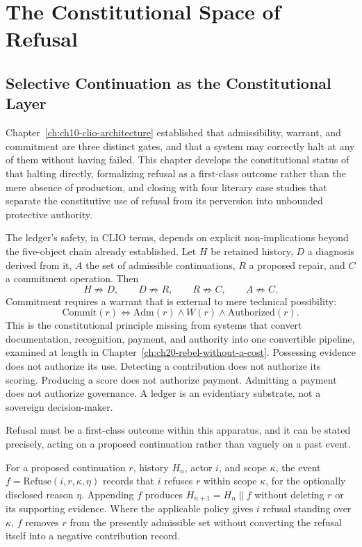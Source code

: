 
\chapter{The Constitutional Space of Refusal}
\label{ch:ch11-constitutional-space-of-refusal}
\section{Selective Continuation as the Constitutional Layer}

Chapter~\ref{ch:ch10-clio-architecture} established that admissibility, warrant, and commitment are three distinct gates, and that a system may correctly halt at any of them without having failed. This chapter develops the constitutional status of that halting directly, formalizing refusal as a first-class outcome rather than the mere absence of production, and closing with four literary case studies that separate the constitutive use of refusal from its perversion into unbounded protective authority.

The ledger's safety, in CLIO terms, depends on explicit non-implications beyond the five-object chain already established. Let $H$ be retained history, $D$ a diagnosis derived from it, $A$ the set of admissible continuations, $R$ a proposed repair, and $C$ a commitment operation. Then
\[
H \not\Rightarrow D, \qquad D \not\Rightarrow R, \qquad R \not\Rightarrow C, \qquad A \not\Rightarrow C.
\]
Commitment requires a warrant that is external to mere technical possibility:
\[
\mathrm{Commit}(r) \iff \mathrm{Adm}(r) \land W(r) \land \mathrm{Authorized}(r).
\]
This is the constitutional principle missing from systems that convert documentation, recognition, payment, and authority into one convertible pipeline, examined at length in Chapter~\ref{ch:ch20-rebel-without-a-cost}. Possessing evidence does not authorize its use. Detecting a contribution does not authorize its scoring. Producing a score does not authorize payment. Admitting a payment does not authorize governance. A ledger is an evidentiary substrate, not a sovereign decision-maker.

Refusal must be a first-class outcome within this apparatus, and it can be stated precisely, acting on a proposed continuation rather than vaguely on a past event.

\begin{definition}
For a proposed continuation $r$, history $H_n$, actor $i$, and scope $\kappa$, the event $f = \mathrm{Refuse}(i,r,\kappa,\eta)$ records that $i$ refuses $r$ within scope $\kappa$, for the optionally disclosed reason $\eta$. Appending $f$ produces $H_{n+1} = H_n \parallel f$ without deleting $r$ or its supporting evidence. Where the applicable policy gives $i$ refusal standing over $\kappa$, $f$ removes $r$ from the presently admissible set without converting the refusal itself into a negative contribution record.
\end{definition}

